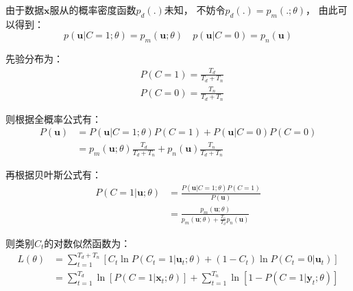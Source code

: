 由于数据$\mathbf{x}$服从的概率密度函数$p_d\left(.\right)$未知，
不妨令$p_d\left(.\right)=p_m\left(.;\theta\right)$，
由此可以得到：
\begin{equation}
    p\left(\mathbf{u}|C=1;\theta\right) = p_m\left(\mathbf{u};\theta\right) \quad p\left(\mathbf{u}|C=0\right)=p_n\left(\mathbf{u}\right)
\end{equation}

先验分布为：
\begin{equation}
    \begin{aligned}
         & P\left(C=1\right)=\frac{T_d}{T_d+T_n} \\
         & P\left(C=0\right)=\frac{T_n}{T_d+T_n}
    \end{aligned}
\end{equation}

则根据全概率公式有：
\begin{equation}
    \begin{aligned}
        P\left(\mathbf{u}\right) & =P\left(\mathbf{u}|C=1;\theta\right)P\left(C=1\right)+P\left(\mathbf{u}|C=0\right)P\left(C=0\right) \\
                                 & =p_m\left(\mathbf{u};\theta\right)\frac{T_d}{T_d+T_n}+p_n\left(\mathbf{u}\right)\frac{T_n}{T_d+T_n}
    \end{aligned}
\end{equation}

再根据贝叶斯公式有：
\begin{equation}
    \begin{aligned}
        P\left(C=1|\mathbf{u};\theta\right) & =\frac{P\left(\mathbf{u}|C=1;\theta\right)P\left(C=1\right)}{P\left(\mathbf{u}\right)}                                 \\
                                            & =\frac{p_m\left(\mathbf{u};\theta\right)}{p_m\left(\mathbf{u};\theta\right)+\frac{T_n}{T_d}p_n\left(\mathbf{u}\right)}
    \end{aligned}
\end{equation}

则类别$C_t$的对数似然函数为：
\begin{equation}
    \label{eq:C_tL}
    \begin{aligned}
        L\left(\theta\right) & =\sum_{t=1}^{T_d+T_n}\left[C_t\ln P\left(C_t=1|\mathbf{u}_t;\theta\right)+\left(1-C_t\right)\ln P\left(C_t=0|\mathbf{u}_t\right)\right]        \\
                             & =\sum_{t=1}^{T_d}\ln\left[P\left(C=1|\mathbf{x}_t;\theta\right)\right]+\sum_{t=1}^{T_n}\ln\left[1-P\left(C=1|\mathbf{y}_t;\theta\right)\right]
    \end{aligned}
\end{equation}


